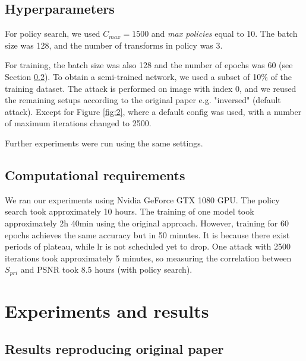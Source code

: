 \subsection{Hyperparameters}

For policy search, we used $C_{max} = 1500$ and \emph{max policies} equal to 10. The batch size was 128, and the number of transforms in policy was 3.

For training, the batch size was also 128 and the number of epochs was 60 (see Section \ref{section:computational-requirements}). To obtain a semi-trained network, we used a subset of 10\% of the training dataset. The attack is performed on image with index $0$, and we reused the remaining setups according to the original paper e.g. "inversed" (default attack). Except for Figure \ref{fig:2}, where a default config was used, with a number of maximum iterations changed to 2500.

Further experiments were run using the same settings.

\subsection{Computational requirements}
\label{section:computational-requirements}
We ran our experiments using Nvidia GeForce GTX 1080 GPU. The policy search took approximately 10 hours. The training of one model took approximately 2h 40min using the original approach. However, training for 60 epochs achieves the same accuracy but in 50 minutes. It is because there exist periods of plateau, while lr is not scheduled yet to drop. One attack with 2500 iterations took approximately 5 minutes, so measuring the correlation between $S_{pri}$ and PSNR took 8.5 hours (with policy search).



\section{Experiments and results}
\label{sec:results}

\subsection{Results reproducing original paper}

